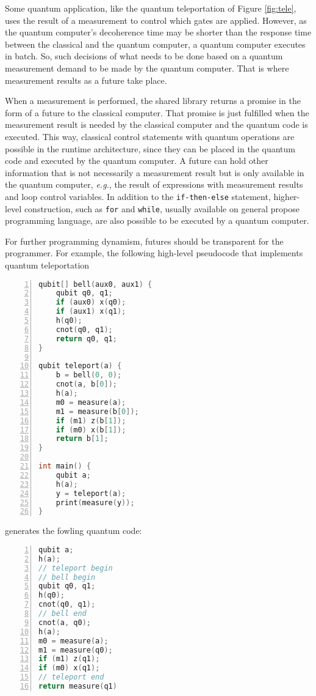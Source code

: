 \documentclass[preprint,3p,times,twocolumn]{elsarticle}
\begin{document}
Some quantum application, like the quantum teleportation of Figure
\ref{fig:tele}, uses the result of a measurement to control which gates are
applied. However, as the quantum computer's decoherence time may be shorter
than the response time between the classical and the quantum computer, a
quantum computer executes in batch. So, such decisions of what needs to be done
based on a quantum measurement demand to be made by the quantum computer.  That
is where measurement results as a future take place.

When a measurement is performed, the shared library returns a promise in the
form of a future to the classical computer. That promise is just fulfilled when
the measurement result is needed by the classical computer and the quantum code
is executed.  This way, classical control statements with quantum operations
are possible in the runtime architecture, since they can be placed in the
quantum code and executed by the quantum computer. A future can hold other
information that is not necessarily a measurement result but is only available
in the quantum computer, \textit{e.g.}, the result of expressions with
measurement results and loop control variables.  In addition to the
\texttt{if-then-else} statement, higher-level construction, such as
\texttt{for} and \texttt{while}, usually available on general propose
programming language, are also possible to be executed by a quantum computer. 

For further programming dynamism, futures should be transparent for the
programmer. For example, the following high-level pseudocode that implements
quantum teleportation
\begin{lstlisting}[numbers=left, xleftmargin=4ex, basicstyle=\linespread{.9}\ttfamily, language=C++,morekeywords={qubit,x,cnot,z,h,measure,print}]
qubit[] bell(aux0, aux1) {
    qubit q0, q1;
    if (aux0) x(q0);
    if (aux1) x(q1);
    h(q0);
    cnot(q0, q1);
    return q0, q1;
}
    
qubit teleport(a) {
    b = bell(0, 0);
    cnot(a, b[0]);
    h(a);
    m0 = measure(a);
    m1 = measure(b[0]);
    if (m1) z(b[1]);
    if (m0) x(b[1]);
    return b[1];
}

int main() {
    qubit a;
    h(a);
    y = teleport(a);
    print(measure(y));
}
\end{lstlisting}
generates the fowling quantum code:
\begin{lstlisting}[numbers=left, xleftmargin=4ex, basicstyle=\linespread{.9}\ttfamily, language=C++,morekeywords={qubit,x,cnot,z,h,measure,print}]
qubit a;
h(a);
// teleport begin
// bell begin
qubit q0, q1;
h(q0);
cnot(q0, q1);
// bell end
cnot(a, q0);
h(a);
m0 = measure(a);
m1 = measure(q0);
if (m1) z(q1);
if (m0) x(q1);
// teleport end
return measure(q1)
\end{lstlisting}
\end{document}
